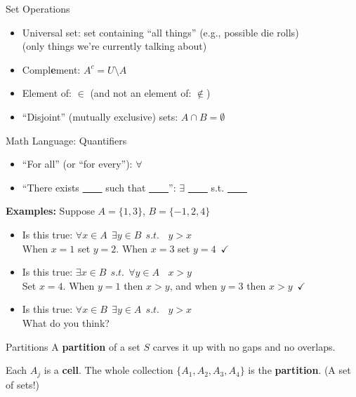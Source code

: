 \begin{frame}{Set Operations}
\begin{itemize}
    \item Universal set: set containing ``all things''  (e.g., possible die rolls)\\(only things we're currently talking about)\vspace{0.6in}
    \item Compl\textbf{e}ment: $A^c=U\setminus A$ \vspace{0.6in}
    \item Element of: $\in$ (and not an element of: $\notin$)\vspace{0.6in}
    \item ``Disjoint'' (mutually exclusive) sets: $A\cap B=\emptyset$
\end{itemize}
\end{frame}

\begin{frame}{Math Language: Quantifiers}
    \begin{itemize}
        \item ``For all'' (or ``for every''): $\forall$
        \item ``There exists \uline{\ \ \ \ } such that \uline{\ \ \ \ }'': $\exists$ \uline{\ \ \ \ } s.t. \uline{\ \ \ \ }
    \end{itemize}
    \bsk
    \textbf{Examples:} Suppose $A=\{1,3\}$, $B=\{-1,2,4\}$ 
    \begin{itemize}
        \item<2->Is this true: $\forall x\in A\ \ \exists y\in B\ \ s.t.\ \ \ \ y>x$\\
        When $x=1$ set $y=2$. When $x=3$ set $y=4$\ $\checkmark$
        \item<3->Is this true: $\exists x\in B\ \ s.t.\ \ \forall y\in A\ \ \ \ x>y$\\
        Set $x=4$. When $y=1$ then $x>y$, and when $y=3$ then $x>y$\ $\checkmark$
        \item<4->Is this true: $\forall x\in B\ \ \exists y\in A\ \ s.t.\ \ \ \ y>x$\\
        What do you think?
    \end{itemize}
\end{frame}


\begin{frame}{Partitions}
A \textbf{partition} of a set $S$ carves it up with no gaps and no overlaps.
\bsk
\centering
{}
\bsk
\raggedright
Each $A_j$ is a \textbf{cell}. The whole collection $\{A_1,A_2,A_3,A_4\}$ is the
\textbf{partition}. (A set of sets!)
\vspace{-0.3in}
\end{frame}


